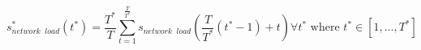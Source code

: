 \begin{equation}
	s^*_{network\;\;load}(t^*) = \frac{T^*}{T}\sum_{t=1}^{\frac{T}{T^*}}s_{network\;\;load}\left(\frac{T}{T^*}(t^*-1) + t\right) \forall t^* \text{ where } t^* \in [1, \dots, T^{*}]
	\label{ch1:equ:down-sampling-to-half-hourly}
\end{equation}